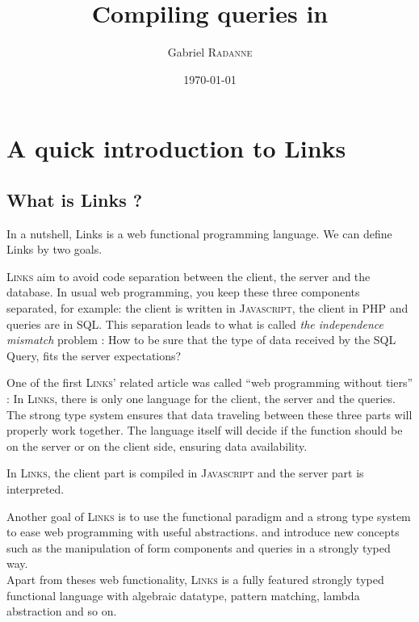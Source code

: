 \documentclass[11pt]{article}
\title{Compiling queries in \links}
\author{Gabriel \textsc{Radanne}}
\date{\today}
\newcommand\mysc[1]{{\rmfamily\textsc{#1}}\xspace}
\newcommand\links{\mysc{Links}}
\newcommand\sql{\mysc{SQL}}
\newcommand\js{\mysc{Javascript}}
\begin{document}
\begin{titlepage}
  \maketitle
  \thispagestyle{empty} %
  
\end{titlepage}



\section{A quick introduction to Links}

\subsection{What is Links ?}
In a nutshell, Links is a web functional programming language. We can define Links by two goals.

\links aim to avoid code separation between the client, the server and the database. In usual web programming, you keep these three components separated, for example: the client is written in \js, the client in \mysc{PHP} and queries are in \sql. 
This separation leads to what is called {\it the independence mismatch} problem : How to be sure that the type of data received by the SQL Query, fits the server expectations?

One of the first \links' related article \cite{links:tiers} was called ``web programming without tiers'' : In \links, there is only one language for the client, the server and the queries. 
The strong type system ensures that data traveling between these three parts will properly work together. 
The language itself will decide if the function should be on the server or on the client side, ensuring data availability.

In \links, the client part is compiled in \js and the server part is interpreted.

Another goal of \links is to use the functional paradigm and a strong type system to ease web programming with useful abstractions. \cite{links:formlets} and \cite{links:effect} introduce new concepts such as the manipulation of form components and queries in a strongly typed way.\\

Apart from theses web functionality, \links is a fully featured strongly typed functional language with algebraic datatype, pattern matching, lambda abstraction and so on.\\
\end{document}

